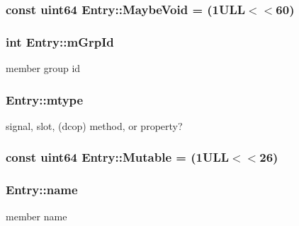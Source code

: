 \subsubsection[{Maybe\+Void}]{\setlength{\rightskip}{0pt plus 5cm}const {\bf uint64} Entry\+::\+Maybe\+Void = (1\+U\+L\+L$<$$<$60)\hspace{0.3cm}{\ttfamily [static]}}\label{class_entry_ac4db81b56383103198fda03a5bfe32f7}
\hypertarget{class_entry_a9f7167fc5b369f1fcd343946803efa0d}{}
\subsubsection[{m\+Grp\+Id}]{\setlength{\rightskip}{0pt plus 5cm}int Entry\+::m\+Grp\+Id}\label{class_entry_a9f7167fc5b369f1fcd343946803efa0d}


member group id 

\hypertarget{class_entry_a4669c5294781bce55ce0ad654460acbd}{}
\subsubsection[{mtype}]{ Entry\+::mtype}\label{class_entry_a4669c5294781bce55ce0ad654460acbd}


signal, slot, (dcop) method, or property? 

\hypertarget{class_entry_abdb668913f12e2bb7f497d1240f4dabe}{}
\subsubsection[{Mutable}]{\setlength{\rightskip}{0pt plus 5cm}const {\bf uint64} Entry\+::\+Mutable = (1\+U\+L\+L$<$$<$26)\hspace{0.3cm}{\ttfamily [static]}}\label{class_entry_abdb668913f12e2bb7f497d1240f4dabe}
\hypertarget{class_entry_a87d6afbe10ea84859ef03b6f046e34d3}{}
\subsubsection[{name}]{ Entry\+::name}\label{class_entry_a87d6afbe10ea84859ef03b6f046e34d3}


member name 

